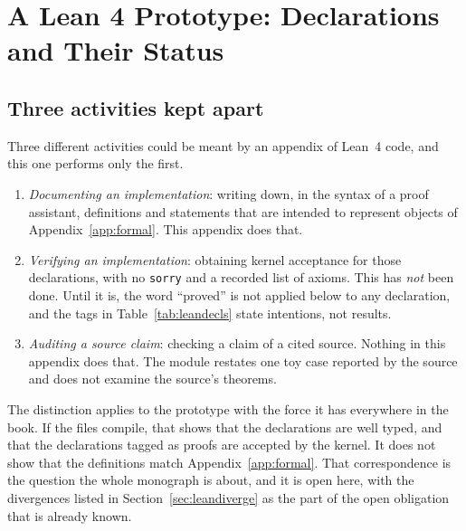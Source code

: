 \chapter{A Lean 4 Prototype: Declarations and Their Status}
\label{app:lean}

\begin{center}
\end{center}

\section{Three activities kept apart}

Three different activities could be meant by an appendix of Lean~4 \cite{Lean4} code, and this one performs only the first.

\begin{enumerate}[label=(\arabic*)]
\item \emph{Documenting an implementation}: writing down, in the syntax of a proof assistant, definitions and statements that are intended to represent objects of Appendix~\ref{app:formal}. This appendix does that.
\item \emph{Verifying an implementation}: obtaining kernel acceptance for those declarations, with no \texttt{sorry} and a recorded list of axioms. This has \emph{not} been done. Until it is, the word ``proved'' is not applied below to any declaration, and the tags in Table~\ref{tab:leandecls} state intentions, not results.
\item \emph{Auditing a source claim}: checking a claim of a cited source. Nothing in this appendix does that. The module  restates one toy case reported by the source and does not examine the source's theorems.
\end{enumerate}

The distinction applies to the prototype with the force it has everywhere in the book. If the files compile, that shows that the declarations are well typed, and that the declarations tagged as proofs are accepted by the kernel. It does not show that the definitions match Appendix~\ref{app:formal}. That correspondence is the question the whole monograph is about, and it is open here, with the divergences listed in Section~\ref{sec:leandiverge} as the part of the open obligation that is already known.


